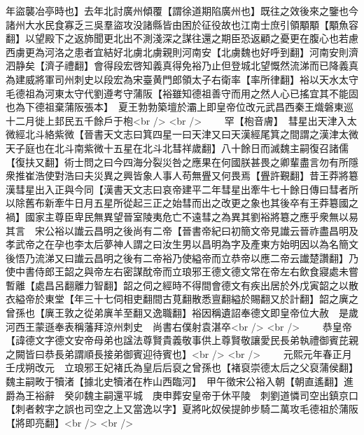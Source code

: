 年盜襲冶亭時也】去年北討廣州傾覆【謂徐道期陷廣州也】既往之效後來之鑒也今諸州大水民食寡乏三吳羣盜攻没諸縣皆由困於征役故也江南士庶引領顒顒【顒魚容翻】以望殿下之返斾聞更北出不測淺深之謀往還之期臣恐返顧之憂更在腹心也若慮西虜更為河洛之患者宜結好北虜北虜親則河南安【北虜魏也好呼到翻】河南安則濟泗静矣【濟子禮翻】會得段宏啓知義真得免裕乃止但登城北望慨然流涕而已降義真為建威將軍司州刺史以段宏為宋臺黄門郎領太子右衛率【率所律翻】裕以天水太守毛德祖為河東太守代劉遵考守蒲阪【裕雖知德祖善守而用之然人心已搖宜其不能固也為下德祖棄蒲阪張本】　夏王勃勃築壇於灞上即皇帝位改元武昌西秦王熾磐東巡十二月徙上邽民五千餘戶于枹<br />
<br />
　　罕【枹音膚】　彗星出天津入太微經北斗絡紫微【晉書天文志曰箕四星一曰天津又曰天漢經尾箕之間謂之漢津太微天子庭也在北斗南紫微十五星在北斗北彗祥歲翻】八十餘日而滅魏主嗣復召諸儒【復扶又翻】術士問之曰今四海分裂災咎之應果在何國朕甚畏之卿輩盡言勿有所隱衆推崔浩使對浩曰夫災異之興皆象人事人苟無舋又何畏焉【舋許覲翻】昔王莽將簒漢彗星出入正與今同【漢書天文志曰哀帝建平二年彗星出牽牛七十餘日傳曰彗者所以除舊布新牽牛日月五星所從起三正之始彗而出之改更之象也其後卒有王莽簒國之禍】國家主尊臣卑民無異望晉室陵夷危亡不遠彗之為異其劉裕將簒之應乎衆無以易其言　宋公裕以䜟云昌明之後尚有二帝【晉書帝紀曰初簡文帝見䜟云晉祚盡昌明及孝武帝之在孕也李太后夢神人謂之曰汝生男以昌明為字及產東方始明因以為名簡文後悟乃流涕又曰䜟云昌明之後有二帝裕乃使縊帝而立恭帝以應二帝云䜟楚讚翻】乃使中書侍郎王韶之與帝左右密謀酖帝而立琅邪王德文德文常在帝左右飲食寢處未嘗暫離【處昌呂翻離力智翻】韶之伺之經時不得間會德文有疾出居於外戊寅韶之以散衣縊帝於東堂【年三十七伺相吏翻間古莧翻散悉亶翻縊於賜翻又於計翻】韶之廙之曾孫也【廙王敦之從弟廙羊至翻又逸職翻】裕因稱遺詔奉德文即皇帝位大赦　是歲河西王蒙遜奉表稱藩拜涼州刺史　尚書右僕射袁湛卒<br />
<br />
　　恭皇帝【諱德文字德文安帝母弟也諡法尊賢貴義敬事供上尊賢敬讓愛民長弟執禮御賓芘親之闕皆曰恭長弟謂順長接弟御賓迎待賓也】<br />
<br />
　　元熙元年春正月壬戌朔改元　立琅邪王妃褚氏為皇后后裒之曾孫也【褚裒崇德太后之父裒蒲侯翻】　魏主嗣畋于犢渚【據北史犢渚在柞山西臨河】　甲午徵宋公裕入朝【朝直遙翻】進爵為王裕辭　癸卯魏主嗣還平城　庚申葬安皇帝于休平陵　刺劉道憐司空出鎮京口【刺者敕字之誤也司空之上又當逸以字】夏將叱奴侯提帥步騎二萬攻毛德祖於蒲阪【將即亮翻】<br />
<br />
